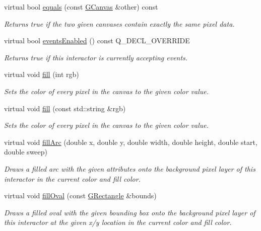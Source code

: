 \begin{DoxyCompactItemize}
virtual bool \mbox{\hyperlink{classGCanvas_a7cf0de4c4124b7de747b9cc17edd6ab9}{equals}} (const \mbox{\hyperlink{classGCanvas}{G\+Canvas}} \&other) const
\begin{DoxyCompactList}\small\item\em Returns true if the two given canvases contain exactly the same pixel data. \end{DoxyCompactList}\item 
virtual bool \mbox{\hyperlink{classGInteractor_ac05ba5b92e2e5146d416fe7f842a0969}{events\+Enabled}} () const Q\+\_\+\+D\+E\+C\+L\+\_\+\+O\+V\+E\+R\+R\+I\+DE
\begin{DoxyCompactList}\small\item\em Returns true if this interactor is currently accepting events. \end{DoxyCompactList}\item 
virtual void \mbox{\hyperlink{classGCanvas_acaf90d64e4fea8f776e722976aeb5070}{fill}} (int rgb)
\begin{DoxyCompactList}\small\item\em Sets the color of every pixel in the canvas to the given color value. \end{DoxyCompactList}\item 
virtual void \mbox{\hyperlink{classGCanvas_a02a5aa7f1474eeedd181e6e46b5eee65}{fill}} (const std\+::string \&rgb)
\begin{DoxyCompactList}\small\item\em Sets the color of every pixel in the canvas to the given color value. \end{DoxyCompactList}\item 
virtual void \mbox{\hyperlink{classGDrawingSurface_a228075ad18bd97b57f9956568c4773f3}{fill\+Arc}} (double x, double y, double width, double height, double start, double sweep)
\begin{DoxyCompactList}\small\item\em Draws a filled arc with the given attributes onto the background pixel layer of this interactor in the current color and fill color. \end{DoxyCompactList}\item 
virtual void \mbox{\hyperlink{classGDrawingSurface_a1ea6e48d59fb588797dba4deab1397e0}{fill\+Oval}} (const \mbox{\hyperlink{classGRectangle}{G\+Rectangle}} \&bounds)
\begin{DoxyCompactList}\small\item\em Draws a filled oval with the given bounding box onto the background pixel layer of this interactor at the given x/y location in the current color and fill color. \end{DoxyCompactList}\item 

\end{DoxyCompactItemize}
